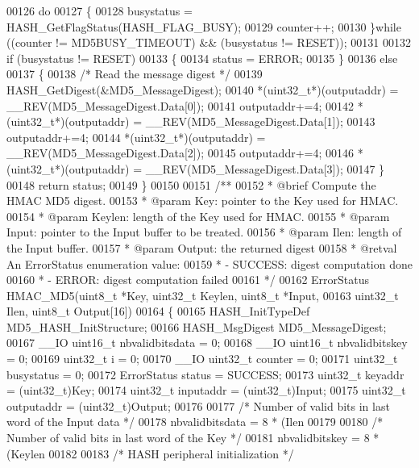 \begin{DoxyCode}
00126   \textcolor{keywordflow}{do}
00127   \{
00128     busystatus = HASH\_GetFlagStatus(HASH_FLAG_BUSY);
00129     counter++;
00130   \}\textcolor{keywordflow}{while} ((counter != MD5BUSY_TIMEOUT) && (busystatus != RESET));
00131 
00132   \textcolor{keywordflow}{if} (busystatus != RESET)
00133   \{
00134      status = ERROR;
00135   \}
00136   \textcolor{keywordflow}{else}
00137   \{
00138     \textcolor{comment}{/* Read the message digest */}
00139     HASH\_GetDigest(&MD5\_MessageDigest);
00140     *(uint32\_t*)(outputaddr)  = \_\_REV(MD5\_MessageDigest.Data[0]);
00141     outputaddr+=4;
00142     *(uint32\_t*)(outputaddr)  = \_\_REV(MD5\_MessageDigest.Data[1]);
00143     outputaddr+=4;
00144     *(uint32\_t*)(outputaddr)  = \_\_REV(MD5\_MessageDigest.Data[2]);
00145     outputaddr+=4;
00146     *(uint32\_t*)(outputaddr)  = \_\_REV(MD5\_MessageDigest.Data[3]);
00147   \}
00148   \textcolor{keywordflow}{return} status;
00149 \}
00150 
00151 \textcolor{comment}{/**}
00152 \textcolor{comment}{  * @brief  Compute the HMAC MD5 digest.}
00153 \textcolor{comment}{  * @param  Key: pointer to the Key used for HMAC.}
00154 \textcolor{comment}{  * @param  Keylen: length of the Key used for HMAC.}
00155 \textcolor{comment}{  * @param  Input: pointer to the Input buffer to be treated.}
00156 \textcolor{comment}{  * @param  Ilen: length of the Input buffer.}
00157 \textcolor{comment}{  * @param  Output: the returned digest  }
00158 \textcolor{comment}{  * @retval An ErrorStatus enumeration value:}
00159 \textcolor{comment}{  *          - SUCCESS: digest computation done}
00160 \textcolor{comment}{  *          - ERROR: digest computation failed}
00161 \textcolor{comment}{  */}
00162 ErrorStatus HMAC_MD5(uint8\_t *Key, uint32\_t Keylen, uint8\_t *Input,
00163                      uint32\_t Ilen, uint8\_t Output[16])
00164 \{
00165   HASH\_InitTypeDef MD5\_HASH\_InitStructure;
00166   HASH\_MsgDigest MD5\_MessageDigest;
00167   \_\_IO uint16\_t nbvalidbitsdata = 0;
00168   \_\_IO uint16\_t nbvalidbitskey = 0;
00169   uint32\_t i = 0;
00170   \_\_IO uint32\_t counter = 0;
00171   uint32\_t busystatus = 0;
00172   ErrorStatus status = SUCCESS;
00173   uint32\_t keyaddr    = (uint32\_t)Key;
00174   uint32\_t inputaddr  = (uint32\_t)Input;
00175   uint32\_t outputaddr = (uint32\_t)Output;
00176 
00177   \textcolor{comment}{/* Number of valid bits in last word of the Input data */}
00178   nbvalidbitsdata = 8 * (Ilen %
00179 
00180   \textcolor{comment}{/* Number of valid bits in last word of the Key */}
00181   nbvalidbitskey = 8 * (Keylen %
00182 
00183   \textcolor{comment}{/* HASH peripheral initialization */}

\end{DoxyCode}
